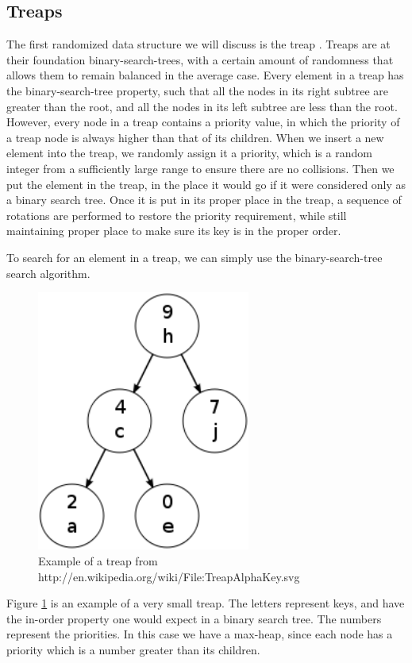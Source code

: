 \documentclass[oribibl]{llncs}
\begin{document}
\subsection{Treaps}
The first randomized data structure we will discuss is the treap \cite{Aragon1989}. Treaps are at their foundation binary-search-trees, with a certain amount of randomness that allows them to remain balanced in the average case. Every element in a treap has the binary-search-tree property, such that all the nodes in its right subtree are greater than the root, and all the nodes in its left subtree are less than the root. However, every node in a treap contains a priority value, in which the priority of a treap node is always higher than that of its children. When we insert a new element into the treap, we randomly assign it a priority, which is a random integer from a sufficiently large range to ensure there are no collisions. Then we put the element in the treap, in the place it would go if it were considered only as a binary search tree. Once it is put in its proper place in the treap, a sequence of rotations are performed to restore the priority requirement, while still maintaining proper place to make sure its key is in the proper order.

To search for an element in a treap, we can simply use the binary-search-tree search algorithm.

\begin{figure}[here]
\center
\includegraphics[width=7cm]{images/treap}
\caption{Example of a treap from http://en.wikipedia.org/wiki/File:TreapAlphaKey.svg}
\label{fig:treap}
\end{figure}

Figure \ref{fig:treap} is an example of a very small treap. The letters represent keys, and have the in-order property one would expect in a binary search tree. The numbers represent the priorities. In this case we have a max-heap, since each node has a priority which is a number greater than its children.
\end{document}

